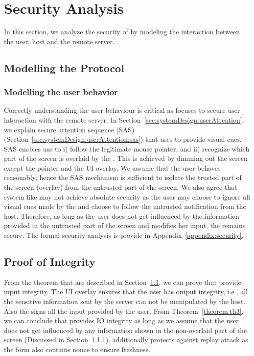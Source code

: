 \section{Security Analysis}
\label{sec:securityAnalysis}

In this section, we analyze the security of \name by modeling the interaction between the user, host and the remote server.


\subsection{Modelling the Protocol}
\label{sec:securityAnalysis:modelling}

\subsubsection{Modelling the user behavior}
\label{sec:securityAnalysis:modelling:user}

Correctly understanding the user behaviour is critical as \name focuses to secure user interaction with the remote server. In Section~\ref{sec:systemDesign:userAttention}, we explain secure attention sequence (SAS) (Section~\ref{sec:systemDesign:userAttention:sas}) that \name uses to provide visual cues. SAS enables use to i) follow the legitimate mouse pointer, and ii) recognize which part of the screen is overlaid by the \device. This is achieved by dimming out the screen except the pointer and the UI overlay. We assume that the user behaves reasonably, hence the SAS mechanism is sufficient to isolate the trusted part of the screen (\device overlay) from the untrusted part of the screen. We also agree that system like \name may not achieve absolute security as the user may choose to ignore all visual cues made by the \device and choose to follow the untrusted notification from the host. Therefore, as long as the user does not get influenced by the information provided in the untrusted part of the screen and modifies her input, the \name remains secure. The formal security analysis is provide in Appendix~\ref{appendix:security}.


\subsection{Proof of Integrity}
\label{sec:securityAnalysis:integrity}

From the theorem that are described in Section~\ref{sec:securityAnalysis:modelling}, we can prove that \name provide input integrity. The UI overlay ensures that the user has output integrity, i.e., all the sensitive information sent by the server can not be manipulated by the host. Also the \device signs all the input provided by the user. From Theorem~\ref{theorem:th3}, we can conclude that \name provides IO integrity as long as we assume that the user does not get influenced by any information shown in the non-overlaid part of the screen (Discussed in Section~\ref{sec:securityAnalysis:modelling:user}). \name additionally protects against replay attack as the form also contains nonce to ensure freshness.  

